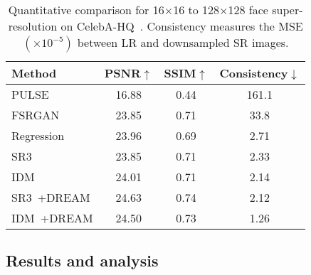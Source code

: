 \begin{table}[]\small
\centering
\caption{Quantitative comparison for 16$\times$16  to 128$\times$128 face super-resolution on CelebA-HQ~\cite{karras2017progressive}. Consistency measures the MSE $(\times 10^{-5})$ between LR and downsampled SR images.}
\vspace{-.1in}
\label{tab:face}
\begin{tabular}{lccc}
\hline
Method     & { PSNR$\uparrow$} & { SSIM$\uparrow$} & {Consistency$\downarrow$} \\ \hline
PULSE~\cite{menon2020pulse}     & 16.88                       & 0.44                        & 161.1                              \\
FSRGAN~\cite{chen2018fsrnet}   & 23.85                       & 0.71                        & 33.8                               \\
Regression~\cite{saharia2022image} & 23.96                       & 0.69                        & 2.71                               \\
SR3~\cite{saharia2022image}        & 23.85                       & 0.71                        & 2.33\\
IDM~\cite{gao2023implicit}     & 24.01                       & 0.71                        & 2.14  
\\ \hline
SR3~\cite{saharia2022image}+DREAM        & \cellcolor{red!20}24.63                       & \cellcolor{red!20}0.74                       & \cellcolor{orange!20}2.12\\
IDM~\cite{gao2023implicit}+DREAM     & \cellcolor{orange!20}24.50                       & \cellcolor{orange!20}0.73                        & \cellcolor{red!20}1.26  
\\ \hline
\end{tabular}
\vspace{-.1in}
\end{table}



\subsection{Results and analysis}

